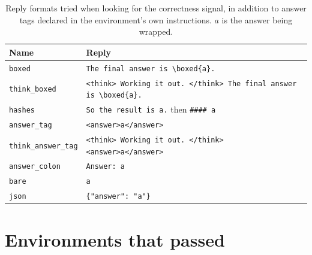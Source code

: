 \begin{table}[h]
\centering
\small
\caption{Reply formats tried when looking for the correctness signal, in addition to answer tags declared in the environment's own instructions. $a$ is the answer being wrapped.}
\label{tab:templates}
\begin{tabular}{@{}l l@{}}
\toprule
Name & Reply \\
\midrule
\texttt{boxed} & \verb|The final answer is \boxed{a}.| \\
\texttt{think\_boxed} & \verb|<think> Working it out. </think> The final answer is \boxed{a}.| \\
\texttt{hashes} & \verb|So the result is a.| then \verb|#### a| \\
\texttt{answer\_tag} & \verb|<answer>a</answer>| \\
\texttt{think\_answer\_tag} & \verb|<think> Working it out. </think> <answer>a</answer>| \\
\texttt{answer\_colon} & \verb|Answer: a| \\
\texttt{bare} & \verb|a| \\
\texttt{json} & \verb|{"answer": "a"}| \\
\bottomrule
\end{tabular}
\end{table}

\section{Environments that passed}
\label{app:passed}

